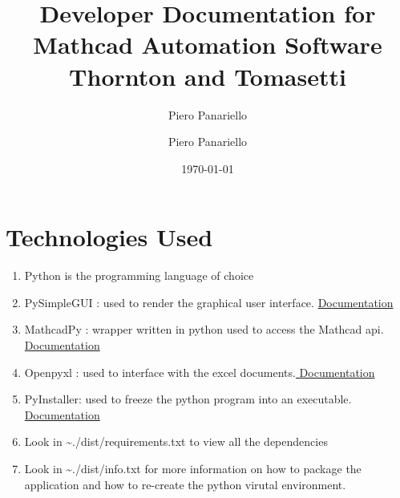 \documentclass[11pt]{article}
\author{Piero Panariello}
\author{Piero Panariello}
\date{\today}
\title{Developer Documentation for Mathcad Automation Software\\\medskip
\large Thornton and Tomasetti}
\begin{document}
\maketitle
\tableofcontents


\section{Technologies Used}
\label{sec:orgce4091d}
\begin{enumerate}
\item Python is the programming language of choice
\item PySimpleGUI : used to render the graphical user interface. \href{https://pysimplegui.readthedocs.io/en/latest/}{Documentation}
\item MathcadPy : wrapper written in python used to access the Mathcad api. \href{https://github.com/MattWoodhead/MathcadPy/blob/master/MathcadPy/\_application.py}{Documentation}
\item Openpyxl : used to interface with the excel documents.\href{https://openpyxl.readthedocs.io/en/stable/}{ Documentation}
\item PyInstaller: used to freeze the python program into an executable.\href{https://pyinstaller.readthedocs.io/en/stable/}{ Documentation}
\item Look in \textasciitilde{}./dist/requirements.txt to view all the dependencies
\item Look in \textasciitilde{}./dist/info.txt for more information on how to package the application and how to re-create the python virutal environment.
\end{enumerate}
\end{document}
